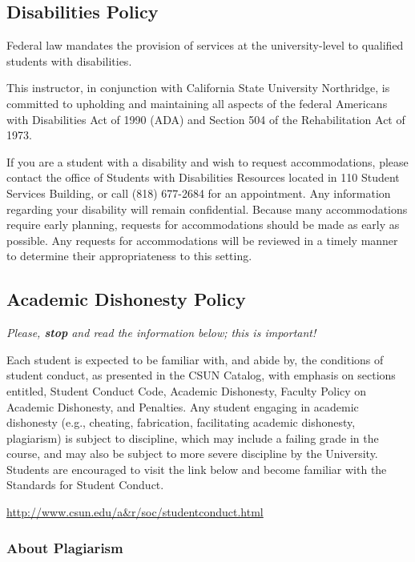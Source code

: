 \documentclass[11pt,]{article}
\begin{document}
\hypertarget{disabilities-policy}{%
\subsection{Disabilities Policy}\label{disabilities-policy}}

Federal law mandates the provision of services at the university-level
to qualified students with disabilities.

This instructor, in conjunction with California State University
Northridge, is committed to upholding and maintaining all aspects of the
federal Americans with Disabilities Act of 1990 (ADA) and Section 504 of
the Rehabilitation Act of 1973.

If you are a student with a disability and wish to request
accommodations, please contact the office of Students with Disabilities
Resources located in 110 Student Services Building, or call (818)
677-2684 for an appointment. Any information regarding your disability
will remain confidential. Because many accommodations require early
planning, requests for accommodations should be made as early as
possible. Any requests for accommodations will be reviewed in a timely
manner to determine their appropriateness to this setting.

\hypertarget{dishonesty}{%
\subsection{Academic Dishonesty Policy}\label{dishonesty}}

\emph{Please, \textbf{stop} and read the information below; this is
important!}

Each student is expected to be familiar with, and abide by, the
conditions of student conduct, as presented in the CSUN Catalog, with
emphasis on sections entitled, Student Conduct Code, Academic
Dishonesty, Faculty Policy on Academic Dishonesty, and Penalties. Any
student engaging in academic dishonesty (e.g., cheating, fabrication,
facilitating academic dishonesty, plagiarism) is subject to discipline,
which may include a failing grade in the course, and may also be subject
to more severe discipline by the University. Students are encouraged to
visit the link below and become familiar with the Standards for Student
Conduct.

\url{http://www.csun.edu/a\&r/soc/studentconduct.html}

\hypertarget{about-plagiarism}{%
\subsubsection{About Plagiarism}\label{about-plagiarism}}
\end{document}
